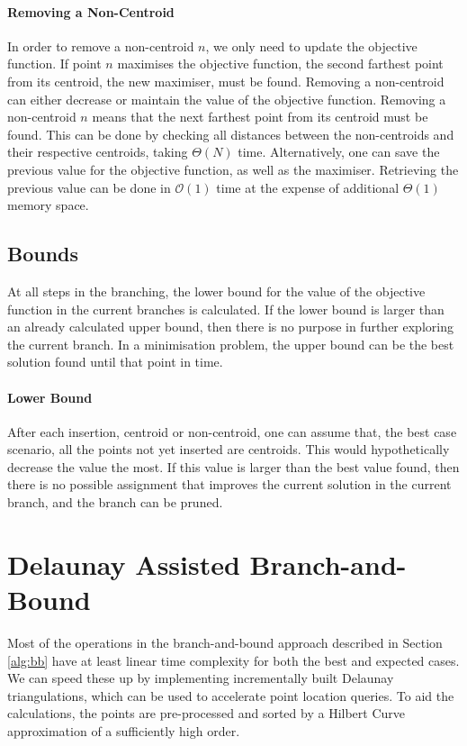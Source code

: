 \paragraph{Removing a Non-Centroid}
In order to remove a non-centroid $n$, we only need to update the objective function. If point $n$ maximises the objective function, the second farthest point from its centroid, the new maximiser, must be found.
Removing a non-centroid can either decrease or maintain the value of the objective function.
Removing a non-centroid $n$ means that the next farthest point from its centroid must be found. This can be done by checking all distances between the non-centroids and their respective centroids, taking $\Theta(N)$ time. Alternatively, one can save the previous value for the objective function, as well as the maximiser. Retrieving the previous value can be done in $\mathcal{O}(1)$ time at the expense of additional $\Theta(1)$ memory space.
\subsection{Bounds}
\label{sec:bounds}
At all steps in the branching, the lower bound for the value of the objective function in the current branches is calculated. If the lower bound is larger than an already calculated upper bound, then there is no purpose in further exploring the current branch. In a minimisation problem, the upper bound can be the best solution found until that point in time.

\paragraph{Lower Bound}
After each insertion, centroid or non-centroid, one can assume that, the best case scenario, all the points not yet inserted are centroids. This would hypothetically decrease the value the most. If this value is larger than the best value found, then there is no possible assignment that improves the current solution in the current branch, and the branch can be pruned.
\section{Delaunay Assisted Branch-and-Bound}
\label{alg:da}

Most of the operations in the branch-and-bound approach described in Section \ref{alg:bb} have at least linear time complexity for both the best and expected cases. We can speed these up by implementing incrementally built Delaunay triangulations, which can be used to accelerate point location queries. To aid the calculations, the points are pre-processed and sorted by a Hilbert Curve approximation of a sufficiently high order.

